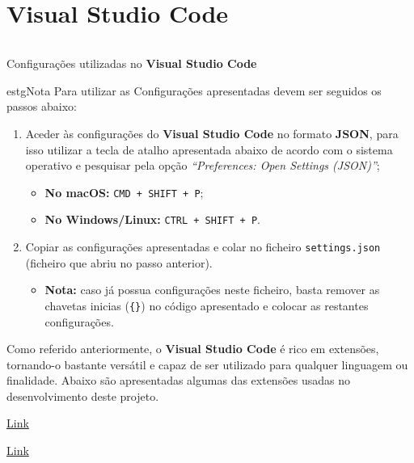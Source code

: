 \section*{\textbf{Visual Studio Code}}
\label{vscodeConfigs}


\begin{longlisting}
	\inputminted{json}{code/vscode-settings.json}
	\caption{Configurações utilizadas no \textbf{Visual Studio Code}}
\end{longlisting}

\begin{mybox}{estg}{Nota}
	Para utilizar as Configurações apresentadas devem ser seguidos os passos abaixo:

	\begin{enumerate}
		\item Aceder às configurações do \textbf{Visual Studio Code} no formato \textbf{JSON}, para isso utilizar a tecla de atalho apresentada abaixo de acordo com o sistema operativo e pesquisar pela opção \textit{``Preferences: Open Settings (JSON)''};
		\begin{itemize}
			\item \textbf{No macOS:} \texttt{CMD + SHIFT + P};
			\item \textbf{No Windows/Linux:} \texttt{CTRL + SHIFT + P}.
		\end{itemize}
		\item Copiar as configurações apresentadas e colar no ficheiro \texttt{settings.json} (ficheiro que abriu no passo anterior).
		\begin{itemize}
			\item \textbf{Nota:} caso já possua configurações neste ficheiro, basta remover as chavetas inicias (\verb|{}|) no código apresentado e colocar as restantes configurações.
		\end{itemize}
	\end{enumerate}
\end{mybox}


Como referido anteriormente, o \textbf{Visual Studio Code} é rico em extensões, tornando-o bastante versátil e capaz de ser utilizado para qualquer linguagem ou finalidade. Abaixo são apresentadas algumas das extensões usadas no desenvolvimento deste projeto.

\begin{minipage}[t]{0.5\textwidth}
	\centering
	
	\href{https://marketplace.visualstudio.com/items?itemName=dsznajder.es7-react-js-snippets}{Link}
\end{minipage}
\begin{minipage}[t]{0.5\textwidth}
	\centering
	
	\href{https://marketplace.visualstudio.com/items?itemName=steoates.autoimport}{Link}
\end{minipage}

